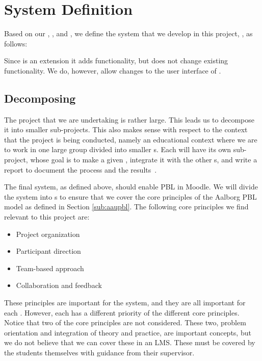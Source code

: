 \chapter{System Definition}
\label{sec:systemDef}
\label{chap:systemDef}
Based on our , , and , we define the system that we develop in this project, \system{}, as follows:


Since \system{} is an extension it adds functionality, but does not change existing functionality.
We do, however, allow changes to the user interface of \moodle{}.


\section{Decomposing \system}
\label{sub:decomposingSys}
The project that we are undertaking is rather large.
This leads us to decompose it into smaller sub-projects.
This also makes sense with respect to the context that the project is being conducted, namely an educational context where we are to work in one large group divided into smaller \subgroup{}s. 
Each \subgroup{} will have its own sub-project, whose goal is to make a given \subsystem{}, integrate it with the other \subsystem{}s, and write a report to document the process and the results~\cite{sw6studieordning}.

The final system, as defined above, should enable PBL in Moodle.
We will divide the system into \subsystem{}s to ensure that we cover the core principles of the Aalborg PBL model as defined in Section \ref{sub:aaupbl}.
The following core principles we find relevant to this project are:

\begin{itemize}
    \item Project organization
    \item Participant direction
    \item Team-based approach
    \item Collaboration and feedback
\end{itemize}

These principles are important for the system, and they are all important for each \subsystem{}.
However, each \subsystem{} has a different priority of the different core principles.
Notice that two of the core principles are not considered.
These two, problem orientation and integration of theory and practice, are important concepts, but we do not believe that we can cover these in an LMS.
These must be covered by the students themselves with guidance from their supervisor.


